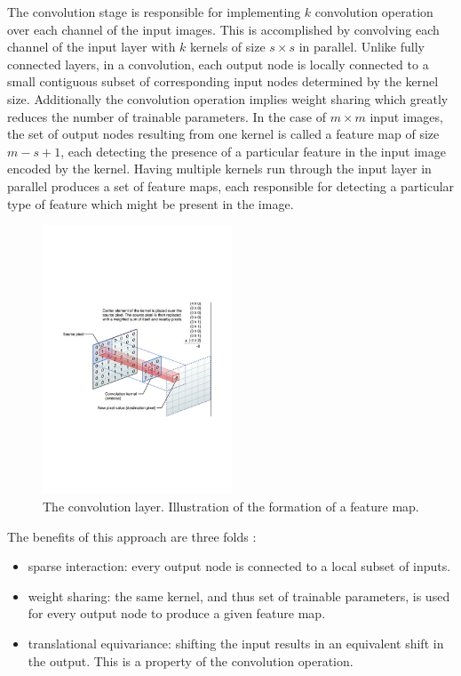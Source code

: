 \noindent The convolution stage is responsible for implementing $k$ convolution operation over each channel of the input images. This is accomplished by convolving each channel of the input layer with $k$ kernels of size $s \times s$ in parallel. Unlike fully connected layers, in a convolution, each output node is locally connected to a small contiguous subset of corresponding input nodes determined by the kernel size. Additionally the convolution operation implies weight sharing which greatly reduces the number of trainable parameters. In the case of $m \times m$ input images, the set of output nodes resulting from one kernel is called a feature map of size $m - s + 1$, each detecting the presence of a particular feature in the input image encoded by the kernel. Having multiple kernels run through the input layer in parallel produces a set of feature maps, each responsible for detecting a particular type of feature which might be present in the image. \\

\begin{figure}
\centering
\includegraphics[trim=2cm 7cm 2cm 7cm, clip=true, height=80mm]{Chapter1/convolution.pdf}
\caption{The convolution layer. Illustration of the formation of a feature map.}
\end{figure}

\noindent The benefits of this approach are three folds :

\begin{itemize}
	\item sparse interaction: every output node is connected to a local subset of inputs.
	\item weight sharing: the same kernel, and thus set of trainable parameters, is used for every output node to produce a given feature map. 
	\item translational equivariance: shifting the input results in an equivalent shift in the output. This is a property of the convolution operation.
\end{itemize}

